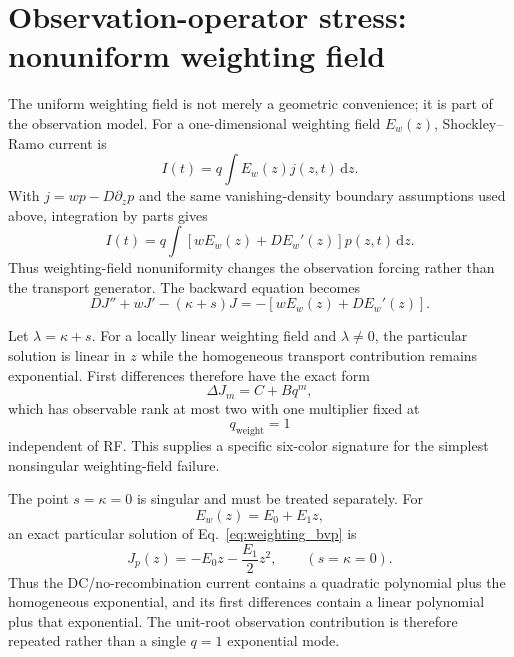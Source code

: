 \documentclass[11pt]{article}
\newcommand{\dd}{\mathrm{d}}
\begin{document}
\section{Observation-operator stress: nonuniform weighting field}

The uniform weighting field is not merely a geometric convenience; it is part of the observation model. For a one-dimensional weighting field $E_w(z)$, Shockley--Ramo current is
\begin{equation}
I(t)=q\int E_w(z)j(z,t)\,\dd z.
\end{equation}
With $j=wp-D\partial_zp$ and the same vanishing-density boundary assumptions used above, integration by parts gives
\begin{equation}
\boxed{I(t)=q\int\left[wE_w(z)+DE_w'(z)\right]p(z,t)\,\dd z.}
\label{eq:weighting_operator}
\end{equation}
Thus weighting-field nonuniformity changes the observation forcing rather than the transport generator. The backward equation becomes
\begin{equation}
\boxed{DJ''+wJ'-(\kappa+s)J=-\left[wE_w(z)+DE_w'(z)\right].}
\label{eq:weighting_bvp}
\end{equation}

Let $\lambda=\kappa+s$. For a locally linear weighting field and $\lambda\neq0$, the particular solution is linear in $z$ while the homogeneous transport contribution remains exponential. First differences therefore have the exact form
\begin{equation}
\boxed{\Delta J_m=C+Bq^m,}
\label{eq:weighting_rank2}
\end{equation}
which has observable rank at most two with one multiplier fixed at
\begin{equation}
\boxed{q_{\mathrm{weight}}=1}
\end{equation}
independent of RF. This supplies a specific six-color signature for the simplest nonsingular weighting-field failure.

The point $s=\kappa=0$ is singular and must be treated separately. For
\begin{equation}
E_w(z)=E_0+E_1z,
\end{equation}
an exact particular solution of Eq.~\eqref{eq:weighting_bvp} is
\begin{equation}
\boxed{J_p(z)=-E_0z-\frac{E_1}{2}z^2,\qquad (s=\kappa=0).}
\label{eq:weighting_dc_particular}
\end{equation}
Thus the DC/no-recombination current contains a quadratic polynomial plus the homogeneous exponential, and its first differences contain a linear polynomial plus that exponential. The unit-root observation contribution is therefore repeated rather than a single $q=1$ exponential mode.
\end{document}
